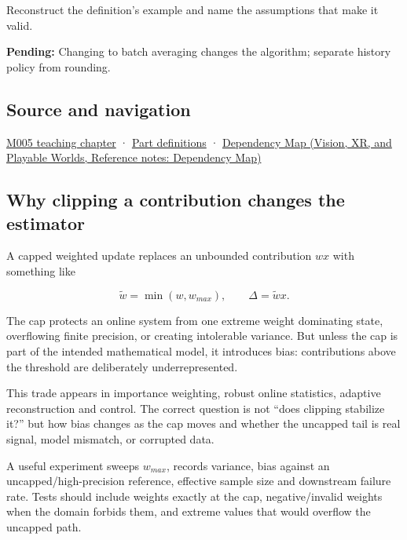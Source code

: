 Reconstruct the definition's example and name the assumptions that make it valid.

\textbf{Pending:} Changing to batch averaging changes the algorithm; separate history policy from rounding.

\subsection{Source and navigation}\label{appendix-1e45d0613db3-source-and-navigation}

\hyperref[01-foundations-i-ch001-when-arithmetic-meets-uncertainty]{M005 teaching chapter} · \hyperref[appendix-fd090d982a15-m005---parts-77-88]{Part definitions} · \href{../07-Vision-XR-and-Playable-Worlds/main.pdf\#nameddest=appendix-4ad47bdd269a}{Dependency Map (Vision, XR, and Playable Worlds, Reference notes: Dependency Map)}

\subsection{Why clipping a contribution changes the estimator}\label{appendix-1e45d0613db3-why-clipping-a-contribution-changes-the-estimator}

A capped weighted update replaces an unbounded contribution \(w x\) with something like

\[
\tilde w = \min(w,w_{max}),
\qquad
\Delta = \tilde w x.
\]

The cap protects an online system from one extreme weight dominating state, overflowing finite precision, or creating intolerable variance. But unless the cap is part of the intended mathematical model, it introduces bias: contributions above the threshold are deliberately underrepresented.

This trade appears in importance weighting, robust online statistics, adaptive reconstruction and control. The correct question is not ``does clipping stabilize it?'' but how bias changes as the cap moves and whether the uncapped tail is real signal, model mismatch, or corrupted data.

A useful experiment sweeps \(w_{max}\), records variance, bias against an uncapped/high-precision reference, effective sample size and downstream failure rate. Tests should include weights exactly at the cap, negative/invalid weights when the domain forbids them, and extreme values that would overflow the uncapped path.
